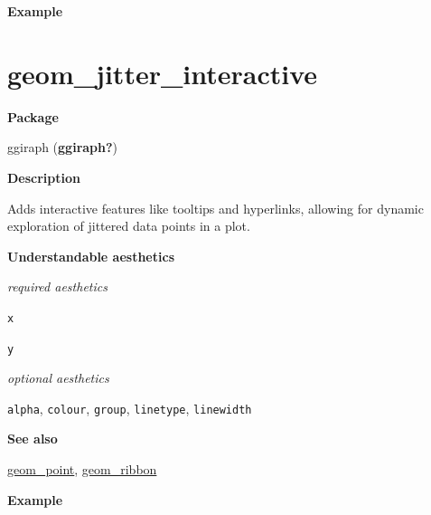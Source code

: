 \documentclass[
  letterpaper,
  DIV=11,
  numbers=noendperiod]{scrreprt}
\newenvironment{Shaded}{\begin{snugshade}}{\end{snugshade}}
\newcommand{\AttributeTok}[1]{\textcolor[rgb]{0.40,0.45,0.13}{#1}}
\newcommand{\ConstantTok}[1]{\textcolor[rgb]{0.56,0.35,0.01}{#1}}
\newcommand{\DecValTok}[1]{\textcolor[rgb]{0.68,0.00,0.00}{#1}}
\newcommand{\FunctionTok}[1]{\textcolor[rgb]{0.28,0.35,0.67}{#1}}
\newcommand{\NormalTok}[1]{\textcolor[rgb]{0.00,0.23,0.31}{#1}}
\newcommand{\OtherTok}[1]{\textcolor[rgb]{0.00,0.23,0.31}{#1}}
\newcommand{\SpecialCharTok}[1]{\textcolor[rgb]{0.37,0.37,0.37}{#1}}
\newcommand{\StringTok}[1]{\textcolor[rgb]{0.13,0.47,0.30}{#1}}
\begin{document}
\textbf{Example}

\begin{Shaded}
\end{Shaded}

\section{geom\_jitter\_interactive}\label{geom_jitter_interactive}

\textbf{Package}

ggiraph (\textbf{ggiraph?})

\textbf{Description}

Adds interactive features like tooltips and hyperlinks, allowing for
dynamic exploration of jittered data points in a plot.

\textbf{Understandable aesthetics}

\emph{required aesthetics}

\texttt{x}

\texttt{y}

\emph{optional aesthetics}

\texttt{alpha}, \texttt{colour}, \texttt{group}, \texttt{linetype},
\texttt{linewidth}

\textbf{See also}

\hyperref[point]{geom\_point}, \hyperref[jitter]{geom\_ribbon}

\textbf{Example}
\end{document}
